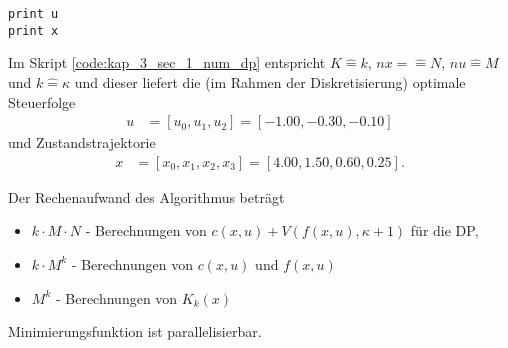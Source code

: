 \begin{exmp}
\begin{lstlisting}[style=PythonStyle, caption=Numerische Algorithmus der \ac{DP} am \exmpref{exmp:kap_3_zeitdis_opt_2}, label=code:kap_3_sec_1_num_dp]
print u
print x
\end{lstlisting}  
Im Skript \ref{code:kap_3_sec_1_num_dp} entspricht $K\hat{=}k$, $nx=\hat{=}N$, $nu\hat{=}M$ und $k\hat{=}\kappa$ und dieser liefert die (im
Rahmen der Diskretisierung) optimale Steuerfolge
\begin{align*}
	u & = \left[u_0, u_1, u_2\right] = \left[-1.00, -0.30, -0.10\right]
\end{align*}
und Zustandstrajektorie
\begin{align*}
	x & = \left[x_0,x_1,x_2,x_3 \right]=\left[4.00,1.50,0.60,0.25 \right].
\end{align*}
\end{exmp}
Der Rechenaufwand des Algorithmus beträgt
\begin{itemize}
  \item $k\cdot M\cdot N$ - Berechnungen von $c(x,u)+V\left(f(x,u),\kappa+1 \right)$ für die \ac{DP},
  \item $k\cdot M^k$ - Berechnungen von $c(x,u)$ und $f(x,u)$
  \item $M^k$ - Berechnungen von $K_k(x)$ \hphantom{ $c(x,u)$ und $f(x,u)$}
\end{itemize}
Minimierungsfunktion ist parallelisierbar.

